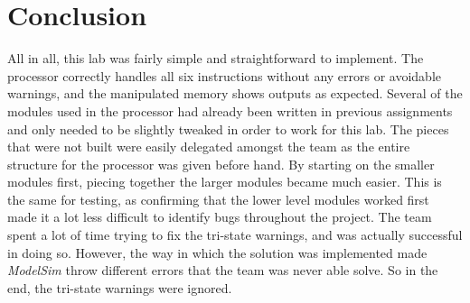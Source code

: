 \section{Conclusion} %
\label{sec:conclusion}

All in all, this lab was fairly simple and straightforward to implement.
The processor correctly handles all six instructions without any errors or avoidable warnings, and the manipulated memory shows outputs as expected.
Several of the modules used in the processor had already been written in previous assignments and only needed to be slightly tweaked in order to work for this lab.
The pieces that were not built were easily delegated amongst the team as the entire structure for the processor was given before hand.
By starting on the smaller modules first, piecing together the larger modules became much easier.
This is the same for testing, as confirming that the lower level modules worked first made it a lot less difficult to identify bugs throughout the project.
The team spent a lot of time trying to fix the tri-state warnings, and was actually successful in doing so.
However, the way in which the solution was implemented made \emph{ModelSim} throw different errors that the team was never able solve.
So in the end, the tri-state warnings were ignored.

